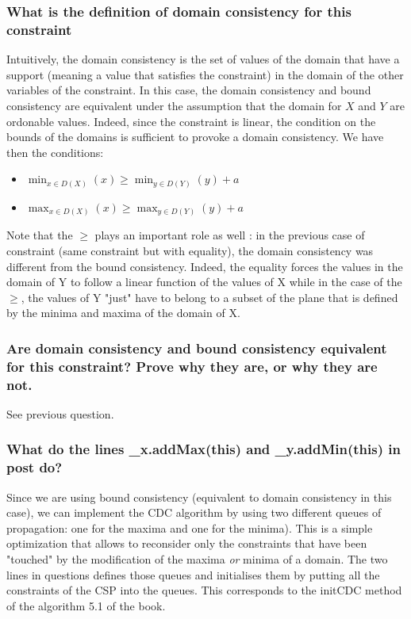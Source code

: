 \documentclass[a4paper ,12pt,french]{article}
\begin{document}
\subsubsection{What is the definition of domain consistency for this constraint}
Intuitively, the domain consistency is the set of values of the domain that have a support (meaning a value that satisfies the constraint) in the domain of the other variables of the constraint. In this case, the domain consistency and bound consistency are equivalent under the assumption that the domain for $X$ and $Y$ are ordonable values. Indeed, since the constraint is linear, the condition on the bounds of the domains is sufficient to provoke a domain consistency. We have then the conditions: 
\begin{itemize}
\item $\min_{x\in D(X)}(x) \geq \min_{y\in D(Y)}(y) + a$
\item $\max_{x\in D(X)}(x) \geq \max_{y\in D(Y)}(y) + a$
\end{itemize}
Note that the $\geq$ plays an important role as well : in the previous case of constraint (same constraint but with equality), the domain consistency was different from the bound consistency. Indeed, the equality forces the values in the domain of Y to follow a linear function of the values of X while in the case of the $\geq$, the values of Y "just" have to belong to a subset of the plane that is defined by the minima and maxima of the domain of X.
\subsubsection{Are domain consistency and bound consistency equivalent for this constraint? Prove why they are, or why they are not.}
See previous question.
\subsubsection{What do the lines \_x.addMax(this) and \_y.addMin(this) in post do?}
Since we are using bound consistency (equivalent to domain consistency in this case), we can implement the CDC algorithm by using two different queues of propagation: one for the maxima and one for the minima). This is a simple optimization that allows to reconsider only the constraints that have been "touched" by the modification of the maxima \textit{or} minima of a domain. The two lines in questions defines those queues and initialises them by putting all the constraints of the CSP into the queues. This corresponds to the initCDC method of the algorithm 5.1 of the book.
\end{document}
